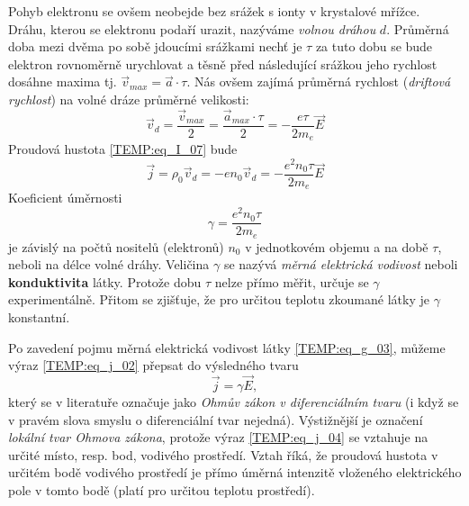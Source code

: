       Pohyb elektronu se ovšem neobejde bez srážek s ionty v krystalové mřížce. Dráhu, kterou se
      elektronu podaří urazit, nazýváme \emph{volnou dráhou} $d$. Průměrná doba mezi dvěma po sobě
      jdoucími srážkami nechť je $\tau$ za tuto dobu se bude elektron rovnoměrně urychlovat a těsně
      před následující srážkou jeho rychlost dosáhne maxima tj. $\vec{v}_{max} = \vec{a}\cdot\tau$.
      Nás ovšem zajímá průměrná rychlost (\emph{driftová rychlost}) na volné dráze průměrné
      velikosti:
      \begin{equation}\label{TEMP:eq_vd_01}
        \vec{v}_d = \frac{\vec{v}_{max}}{2} =\frac{\vec{a}_{max}\cdot\tau}{2} 
                  = -\frac{e\tau}{2m_e}\vec{E}
      \end{equation}   
      Proudová hustota \ref{TEMP:eq_I_07} bude
      \begin{equation}\label{TEMP:eq_j_02}
        \vec{j} = \rho_0\vec{v}_d= -en_0\vec{v}_d = -\frac{e^2n_0\tau}{2m_e}\vec{E}
      \end{equation}       
      Koeficient úměrnosti 
      \begin{equation}\label{TEMP:eq_g_03}
        \gamma = \frac{e^2n_0\tau}{2m_e}
      \end{equation}     
      je závislý na počtů nositelů (elektronů) $n_0$ v jednotkovém objemu a na době $\tau$, neboli
      na délce volné dráhy. Veličina $\gamma$ se nazývá \emph{měrná elektrická vodivost} neboli
      \textbf{konduktivita} látky. Protože dobu $\tau$ nelze přímo měřit, určuje se $\gamma$
      experimentálně. Přitom se zjišťuje, že pro určitou teplotu zkoumané látky je $\gamma$
      konstantní.
      
      Po zavedení pojmu měrná elektrická vodivost látky \ref{TEMP:eq_g_03}, můžeme výraz
      \ref{TEMP:eq_j_02} přepsat do výsledného tvaru
      \begin{equation}\label{TEMP:eq_j_04}
        \vec{j} = \gamma\vec{E},
      \end{equation}              
      který se v literatuře označuje jako \emph{Ohmův zákon v diferenciálním tvaru} (i když se v
      pravém slova smyslu o diferenciální tvar nejedná). Výstižnější je označení \emph{lokální tvar
      Ohmova zákona}, protože výraz \ref{TEMP:eq_j_04} se vztahuje na určité místo, resp. bod,
      vodivého prostředí. Vztah říká, že proudová hustota v určitém bodě vodivého prostředí je
      přímo úměrná intenzitě vloženého elektrického pole v tomto bodě (platí pro určitou teplotu
      prostředí).
      
